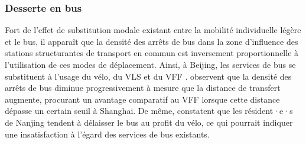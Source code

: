 \begin{refsegment}
\subsubsection*{Desserte en bus
    \label{chap2:desserte-bus}
    }
    
Fort de l'effet de substitution modale existant entre la mobilité individuelle légère et le bus, il apparaît que la densité des arrêts de bus dans la zone d'influence des stations structurantes de transport en commun est inversement proportionnelle à l'utilisation de ces modes de déplacement. Ainsi, à Beijing, les services de bus se substituent à l'usage du vélo, du \acrshort{VLS} \textcolor{blue}{\autocite[55]{zhao_bicycle-metro_2017}} et du \acrshort{VFF} \textcolor{blue}{\autocite[16]{wang_spatiotemporal_2020}}. \textcolor{blue}{\textcite[10]{li_exploring_2021}} observent que la densité des arrêts de bus diminue progressivement à mesure que la distance de transfert augmente, procurant un avantage comparatif au \acrshort{VFF} lorsque cette distance dépasse un certain seuil à Shanghai. De même, \textcolor{blue}{\textcite[20]{luan_better_2020}} constatent que les résident·e·s de Nanjing tendent à délaisser le bus au profit du vélo, ce qui pourrait indiquer une insatisfaction à l'égard des services de bus existants.%


\end{refsegment}
